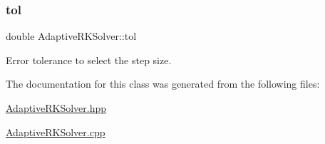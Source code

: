 \subsubsection{\texorpdfstring{tol}{tol}}
{\footnotesize\ttfamily double Adaptive\+R\+K\+Solver\+::tol\hspace{0.3cm}{\ttfamily [private]}}



Error tolerance to select the step size. 



The documentation for this class was generated from the following files\+:\begin{DoxyCompactItemize}
\item 
\hyperlink{AdaptiveRKSolver_8hpp}{Adaptive\+R\+K\+Solver.\+hpp}\item 
\hyperlink{AdaptiveRKSolver_8cpp}{Adaptive\+R\+K\+Solver.\+cpp}\end{DoxyCompactItemize}

